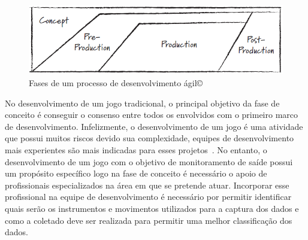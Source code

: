 \begin{figure}[!htbp]
 \centering
 \includegraphics[scale=0.5]{./img/stages-game-development-agil.png}
\caption[Fases de um processo de desenvolvimento ágil\copyright] {Fases de um processo de desenvolvimento ágil\copyright ~\cite{keith2010agile}}
 \label{fig:processokeit}
\end{figure}




No desenvolvimento de um jogo tradicional, o principal objetivo da fase de conceito é conseguir o consenso entre todos os envolvidos com o primeiro marco de desenvolvimento. Infelizmente, o desenvolvimento de um jogo é uma atividade que possui muitos riscos devido sua complexidade, equipes de desenvolvimento mais experientes são mais indicadas para esses projetos~\cite{fullerton2008game}. No entanto, o desenvolvimento de um jogo com o objetivo de monitoramento de saíde possui um propósito específico logo na fase de conceito é necessário o apoio de profissionais especializados na área em que se pretende atuar. Incorporar esse profissional na equipe de desenvolvimento é necessário por permitir identificar quais serão os instrumentos e movimentos utilizados para a captura dos dados e como a coletado deve ser realizada para permitir uma melhor classificação dos dados.

